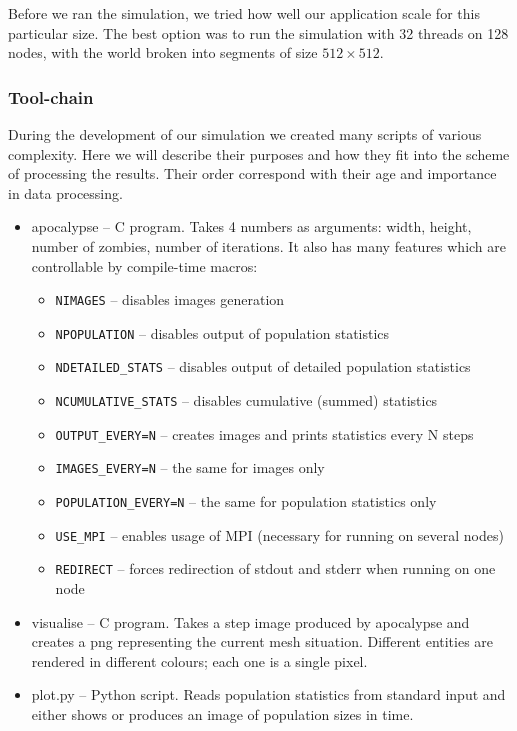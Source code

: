 \documentclass[a4paper]{article}
\begin{document}
Before we ran the simulation, we tried how well our application scale for this particular size.
The best option was to run the simulation with 32 threads on 128 nodes, with the world broken into segments of size $512 \times 512$.

\subsubsection{Tool-chain}

During the development of our simulation we created many scripts of various complexity.
Here we will describe their purposes and how they fit into the scheme of processing the results.
Their order correspond with their age and importance in data processing.

\begin{itemize}
\item apocalypse -- C program. Takes 4 numbers as arguments: width, height, number of zombies, number of iterations.
    It also has many features which are controllable by compile-time macros:
    \begin{itemize}
    \item \verb|NIMAGES| -- disables images generation
    \item \verb|NPOPULATION| -- disables output of population statistics
    \item \verb|NDETAILED_STATS| -- disables output of detailed population statistics
    \item \verb|NCUMULATIVE_STATS| -- disables cumulative (summed) statistics
    \item \verb|OUTPUT_EVERY=N| -- creates images and prints statistics every N steps
    \item \verb|IMAGES_EVERY=N| -- the same for images only
    \item \verb|POPULATION_EVERY=N| -- the same for population statistics only
    \item \verb|USE_MPI| -- enables usage of MPI (necessary for running on several nodes)
    \item \verb|REDIRECT| -- forces redirection of stdout and stderr when running on one node 
    \end{itemize}
\item visualise -- C program. Takes a step image produced by apocalypse and creates a png representing the current mesh situation.
    Different entities are rendered in different colours; each one is a single pixel.
\item plot.py -- Python script. Reads population statistics from standard input and either shows or produces an image of population sizes in time.

\end{itemize}
\end{document}
